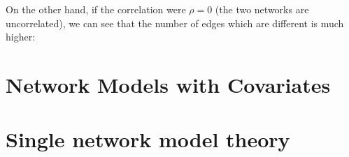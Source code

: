 \documentclass[letterpaper,10pt,english]{jupyterBook}
\begin{document}
\begin{sphinxVerbatim}[commandchars=\\\{\}]
   

  
       
\end{sphinxVerbatim}

\noindent{}

\sphinxAtStartPar
On the other hand, if the correlation were \(\rho = 0\) (the two networks are uncorrelated), we can see that the number of edges which are different is much higher:

\begin{sphinxVerbatim}[commandchars=\\\{\}]
  
       
\end{sphinxVerbatim}

\noindent{}


\section{Network Models with Covariates}
\label{\detokenize{representations/ch5/models-with-covariates:network-models-with-covariates}}\label{\detokenize{representations/ch5/models-with-covariates::doc}}

\section{Single network model theory}
\label{\detokenize{representations/ch5/single-network-models_theory:single-network-model-theory}}\label{\detokenize{representations/ch5/single-network-models_theory::doc}}
\end{document}
